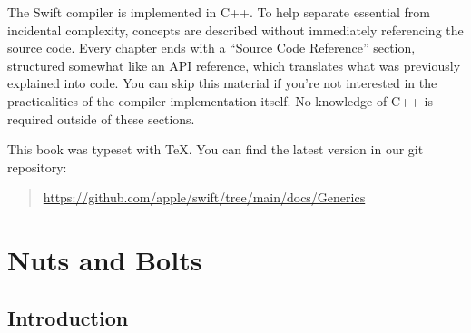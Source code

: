 \documentclass[a4paper,headsepline,bibliography=totoc,toc=flat,fleqn,twoside=semi]{scrbook}
\theoremstyle{definition}
\theoremstyle{definition}
\theoremstyle{definition}
\begin{document}
The Swift compiler is implemented in C++. To help separate essential from incidental complexity, concepts are described without immediately referencing the source code. Every chapter ends with a ``Source Code Reference'' section, structured somewhat like an API reference, which translates what was previously explained into code. You can skip this material if you're not interested in the practicalities of the compiler implementation itself. No knowledge of C++ is required outside of these sections.

This book was typeset with \TeX. You can find the latest version in our git repository:
\begin{quote}
\url{https://github.com/apple/swift/tree/main/docs/Generics}
\end{quote}


\tableofcontents

\part{Nuts and Bolts}\label{part fundamentals}

\chapter{Introduction}\label{roadmap}
\end{document}
